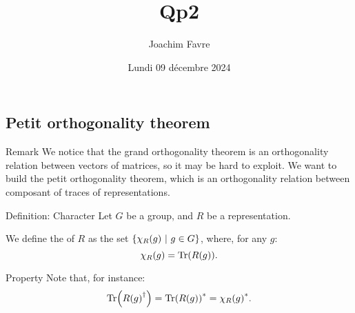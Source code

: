 \documentclass[a4paper]{article}
\title{Qp2}
\author{Joachim Favre}
\date{Lundi 09 décembre 2024}
\begin{document}
\maketitle


\subsection{Petit orthogonality theorem}

\begin{parag}{Remark}
    We notice that the grand orthogonality theorem is an orthogonality relation between vectors of matrices, so it may be hard to exploit. We want to build the petit orthogonality theorem, which is an orthogonality relation between composant of traces of representations.
\end{parag}

\begin{parag}{Definition: Character}
    Let $G$ be a group, and $R$ be a representation.

    We define the  of $R$ as the set $\left\{\chi_R\left(g\right) \suchthat g \in G\right\}$, where, for any $g$:
    \[\chi_R\left(g\right) = \Tr\left(R\left(g\right)\right).\]
    
    \begin{subparag}{Property}
        Note that, for instance: 
        \[\Tr\left(R\left(g\right)^{\dagger}\right) = \Tr\left(R\left(g\right)\right)^* = \chi_R\left(g\right)^*.\]
    \end{subparag}
\end{parag}
\end{document}
